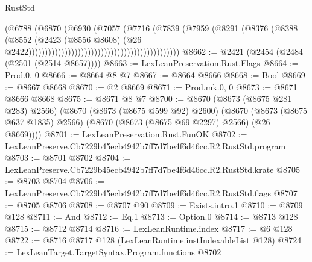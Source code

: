 \begin{lexlean}{RustStd}
\begin{coremodule}
                                                                      (@6788
                                                                        (@6870
                                                                          (@6930
                                                                            (@7057
                                                                              (@7716
                                                                                (@7839
                                                                                  (@7959
                                                                                    (@8291
                                                                                      (@8376
                                                                                        (@8388
                                                                                          (@8552
                                                                                            (@2423
                                                                                              (@8556
                                                                                                @8608)
                                                                                              (@26
                                                                                                @2422))))))))))))))))))))))))))))))))))))))))))))))
@8662 := @2421 (@2454 (@2484 (@2501 (@2514 @8657))))
@8663 := LexLeanPreservation.Rust.Flags
@8664 := Prod.{0, 0}
@8666 := @8664 @8 @7
@8667 := @8664 @8666
@8668 := Bool
@8669 := @8667 @8668
@8670 := @2 @8669
@8671 := Prod.mk.{0, 0}
@8673 := @8671 @8666 @8668
@8675 := @8671 @8 @7
@8700 := @8670
    (@8673 (@8675 @281 @283) @2566)
    (@8670
      (@8673 (@8675 @599 @92) @2600)
      (@8670 (@8673 (@8675 @637 @1835) @2566) (@8670 (@8673 (@8675 @69 @2297) @2566) (@26 @8669))))
@8701 := LexLeanPreservation.Rust.FunOK
@8702 := LexLeanPreserve.Cb7229b45ecb4942b7ff7d7be4f6d46cc.R2.RustStd.program
@8703 := @8701 @8702
@8704 := LexLeanPreserve.Cb7229b45ecb4942b7ff7d7be4f6d46cc.R2.RustStd.krate
@8705 := @8703 @8704
@8706 := LexLeanPreserve.Cb7229b45ecb4942b7ff7d7be4f6d46cc.R2.RustStd.flags
@8707 := @8705 @8706
@8708 := @8707 @90
@8709 := Exists.intro.{1}
@8710 := @8709 @128
@8711 := And
@8712 := Eq.{1}
@8713 := Option.{0}
@8714 := @8713 @128
@8715 := @8712 @8714
@8716 := LexLeanRuntime.index
@8717 := @6 @128
@8722 := @8716 @8717 @128 (LexLeanRuntime.instIndexableList @128)
@8724 := LexLeanTarget.TargetSyntax.Program.functions @8702

\end{coremodule}
\end{lexlean}
